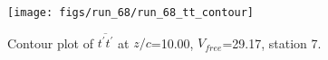 \begin{figure}[H]
\centering
\texttt{[image: figs/run\_68/run\_68\_tt\_contour]}
\caption{Contour plot of $\overline{t^\prime t^\prime}$ at $z/c$=10.00, $V_{free}$=29.17, station 7.}
\end{figure}


